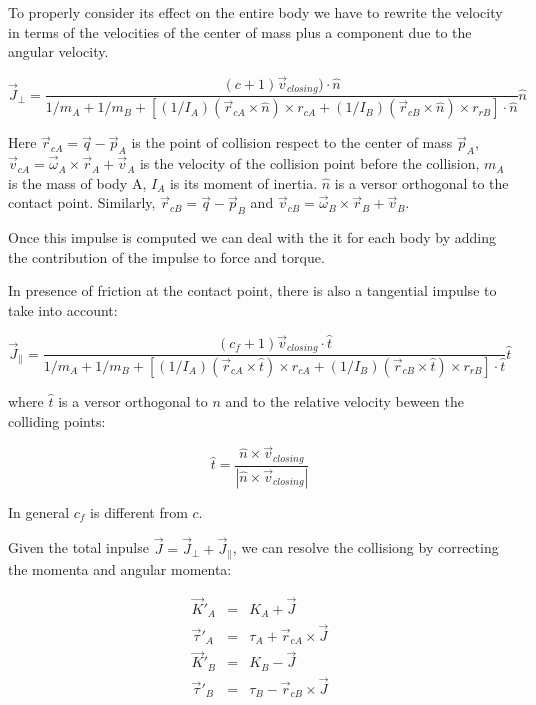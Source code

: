 \documentclass[12pt]{article}
\begin{document}
To properly consider its effect on the entire body we have to rewrite the velocity in terms of the velocities of the center of mass plus a component due to the angular velocity.

\begin{equation}
{\vec J}_{\perp} = \frac {(c+1) \vec v_{closing}) \cdot \hat n}{1/m_A+1/m_B + \left[ (1/I_A)(\vec r_{cA} \times \hat n)\times r_{cA}  + (1/I_B)(\vec r_{cB} \times \hat n) \times r_{rB}\right] \cdot {\hat n}}{\hat n}
\label{impulse}
\end{equation}

Here $\vec r_{cA} = \vec q-\vec p_A$ is the point of collision respect to the center of mass $\vec p_A$, $\vec v_{cA} = \vec \omega_A \times \vec r_A + \vec v_A$ is the velocity of the collision point before the collision, $m_A$ is the mass of body A, $I_A$ is its moment of inertia. $\hat n$ is a versor orthogonal to the contact point. Similarly, $\vec r_{cB} = \vec q-\vec p_B$ and $\vec v_{cB} = \vec \omega_B \times \vec r_B + \vec v_B$.

Once this impulse is computed we can deal with the it for each body by adding the contribution of the impulse to force and torque.

In presence of friction at the contact point, there is also a tangential impulse to take into account:

\begin{equation}
{\vec J}_{\parallel} = \frac{(c_f+1) \vec v_{closing} \cdot \hat t}{1/m_A+1/m_B + \left[ (1/I_A)(\vec r_{cA} \times \hat t)\times r_{cA}  + (1/I_B)(\vec r_{cB} \times \hat t) \times r_{rB}\right] \cdot {\hat t}}{\hat t}
\label{impulse}
\end{equation}

where $\hat t$ is a versor orthogonal to $n$ and to the relative velocity beween the colliding points:

\begin{equation}
  \hat t = \frac{\hat n \times \vec v_{closing}}{\left|\hat n \times\vec v_{closing}\right|}
\end{equation}

In general $c_f$ is different from $c$. 

Given the total inpulse $\vec J = \vec J_{\perp}+\vec J_{\parallel}$, we can resolve the collisiong by correcting the momenta and angular momenta:

\begin{eqnarray}
\vec K'_A &=& K_A + \vec J \\
\vec \tau'_A &=& \tau_A + \vec r_{cA} \times \vec J \\
\vec K'_B &=& K_B - \vec J \\
\vec \tau'_B &=& \tau_B - \vec r_{cB} \times \vec J
\label{impulse2}
\end{eqnarray}
\end{document}
